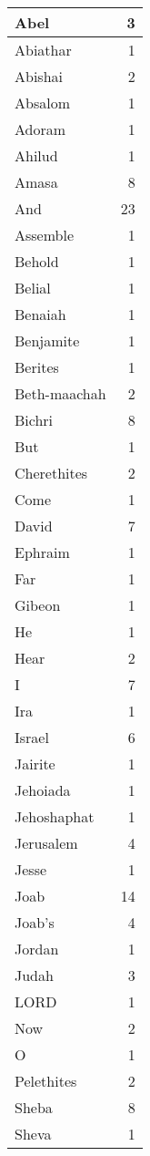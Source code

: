 \begin{center}
\begin{longtable}{l|r}
\hline \hline
\endlastfoot
Abel & 3 \\ \hline
Abiathar & 1 \\ \hline
Abishai & 2 \\ \hline
Absalom & 1 \\ \hline
Adoram & 1 \\ \hline
Ahilud & 1 \\ \hline
Amasa & 8 \\ \hline
And & 23 \\ \hline
Assemble & 1 \\ \hline
Behold & 1 \\ \hline
Belial & 1 \\ \hline
Benaiah & 1 \\ \hline
Benjamite & 1 \\ \hline
Berites & 1 \\ \hline
Beth-maachah & 2 \\ \hline
Bichri & 8 \\ \hline
But & 1 \\ \hline
Cherethites & 2 \\ \hline
Come & 1 \\ \hline
David & 7 \\ \hline
Ephraim & 1 \\ \hline
Far & 1 \\ \hline
Gibeon & 1 \\ \hline
He & 1 \\ \hline
Hear & 2 \\ \hline
I & 7 \\ \hline
Ira & 1 \\ \hline
Israel & 6 \\ \hline
Jairite & 1 \\ \hline
Jehoiada & 1 \\ \hline
Jehoshaphat & 1 \\ \hline
Jerusalem & 4 \\ \hline
Jesse & 1 \\ \hline
Joab & 14 \\ \hline
Joab's & 4 \\ \hline
Jordan & 1 \\ \hline
Judah & 3 \\ \hline
LORD & 1 \\ \hline
Now & 2 \\ \hline
O & 1 \\ \hline
Pelethites & 2 \\ \hline
Sheba & 8 \\ \hline
Sheva & 1 \\ \hline

\end{longtable}
\end{center}
